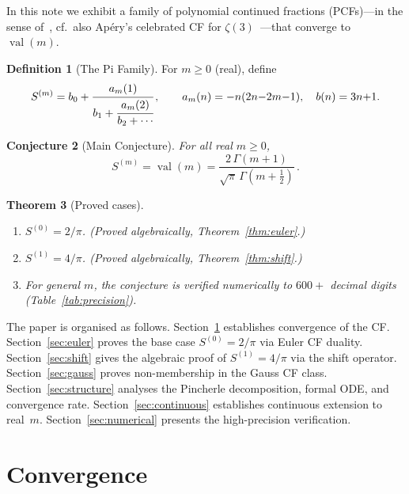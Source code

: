 \documentclass[11pt]{article}
\newcommand{\half}{\tfrac{1}{2}}
\newcommand{\val}{\operatorname{val}}
\newtheorem{theorem}{Theorem}[section]
\newtheorem{conjecture}[theorem]{Conjecture}
\theoremstyle{definition}
\newtheorem{definition}[theorem]{Definition}
\theoremstyle{remark}
\begin{document}
In this note we exhibit a family of polynomial continued fractions
(PCFs)---in the sense of~\cite{raayoni2021generating},
cf.~also Ap\'ery's celebrated CF for $\zeta(3)$~\cite{apery1979irrationalite}---that converge to~$\val(m)$.

\begin{definition}[The Pi Family]\label{def:family}
For $m \geq 0$ (real), define
\begin{equation}\label{eq:pcf}
  S^{(m)} = b_0 + \cfrac{a_m(1)}{b_1 + \cfrac{a_m(2)}{b_2 + \cdots}}\,,
  \qquad
  a_m(n) = -n(2n{-}2m{-}1),\quad b(n) = 3n{+}1.
\end{equation}
\end{definition}

\begin{conjecture}[Main Conjecture]\label{conj:main}
For all real $m \geq 0$,
\[
  S^{(m)} = \val(m) = \frac{2\,\Gamma(m{+}1)}{\sqrt{\pi}\,\Gamma(m{+}\half)}\,.
\]
\end{conjecture}

\begin{theorem}[Proved cases]\label{thm:proved}
\mbox{}
\begin{enumerate}[label=\textup{(\alph*)}]
\item $S^{(0)} = 2/\pi$.  \textup{(}Proved algebraically,
  Theorem~\ref{thm:euler}.\textup{)}
\item $S^{(1)} = 4/\pi$.
  \textup{(}Proved algebraically, Theorem~\ref{thm:shift}.\textup{)}
\item For general $m$, the conjecture is verified numerically to
  $600{+}$ decimal digits \textup{(}Table~\ref{tab:precision}\textup{)}.
\end{enumerate}
\end{theorem}

\medskip
The paper is organised as follows.
Section~\ref{sec:convergence} establishes convergence of the CF.
Section~\ref{sec:euler} proves the base case $S^{(0)}=2/\pi$ via
Euler CF duality.
Section~\ref{sec:shift} gives the algebraic proof of $S^{(1)}=4/\pi$
via the shift operator.
Section~\ref{sec:gauss} proves non-membership in the Gauss CF class.
Section~\ref{sec:structure} analyses the Pincherle decomposition,
formal ODE, and convergence rate.
Section~\ref{sec:continuous} establishes continuous extension to
real~$m$.
Section~\ref{sec:numerical} presents the high-precision verification.


\section{Convergence}\label{sec:convergence}
\end{document}
